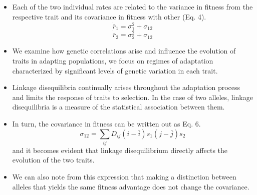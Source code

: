 \documentclass[11pt,one column]{article}
\begin{document}
\begin{itemize}
\begin{itemize}
	\item Each of the two individual rates are related to the variance in fitness from the respective trait and its covariance in fitness with other (Eq. 4). \[ \dot{\bar{r}}_1=\sigma_1^2+\sigma_{12}\] \[ \dot{\bar{r}}_2=\sigma_2^2+\sigma_{12} \]
	\item We examine how genetic correlations arise and influence the evolution of traits in adapting populations, we focus on regimes of adaptation characterized by significant levels of genetic variation in each trait. 
	\item Linkage disequilibria continually arises throughout the adaptation process and limits the response of traits to selection. In the case of two alleles, linkage disequilibria is a measure of the statistical association between them. 
	\item In turn, the covariance in fitness can be written out as Eq. 6. \[ \sigma_{12}=\sum_{ij}D_{ij}(i-\bar{i})s_1 (j-\bar{j}) s_2 \] and it becomes evident that linkage disequilibrium directly affects the evolution of the two traits.
	\item We can also note from this expression that making a distinction between alleles that yields the same fitness advantage does not change the covariance.


\end{itemize}
\end{itemize}
\end{document}
